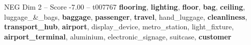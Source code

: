 \begin{textsample}{NEG Dim 2 – Score -7.00 – t007767}  \label{ex:f2_neg_001}
\textbf{flooring}, \textbf{lighting}, \textbf{floor}, \textbf{bag}, \textbf{ceiling}, luggage\_\&\_bags, \textbf{baggage}, \textbf{passenger}, \textbf{travel}, hand\_luggage, \textbf{cleanliness}, \textbf{transport\_hub}, \textbf{airport}, display\_device, metro\_station, light\_fixture, \textbf{airport\_terminal}, aluminium, electronic\_signage, suitcase, \textbf{customer}

\end{textsample}
